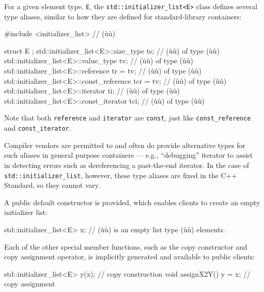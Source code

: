 For a given element type, \lstinline!E!, the
\lstinline!std::initializer_list<E>! class defines several type aliases,
similar to how they are defined for standard-library containers:

\begin{emcppslisting}[emcppsbatch=e3]
#include <initializer_list>  // (ù{}ù)

struct E { };
std::initializer_list<E>::size_type       ts;        // (ù{}ù)  of type (ù{}ù)
std::initializer_list<E>::value_type      tv;        // (ù{}ù)  of type (ù{}ù)
std::initializer_list<E>::reference       tr  = tv;  // (ù{}ù)  of type (ù{}ù)
std::initializer_list<E>::const_reference tcr = tv;  // (ù{}ù) of type (ù{}ù)
std::initializer_list<E>::iterator        ti;        // (ù{}ù)  of type (ù{}ù)
std::initializer_list<E>::const_iterator  tci;       // (ù{}ù) of type (ù{}ù)
\end{emcppslisting}
    

\noindent Note that both \lstinline!reference! and \lstinline!iterator! are
\lstinline!const!, just like \lstinline!const_reference! and
\lstinline!const_iterator!.

Compiler vendors are permitted to and often do provide alternative types
for such aliases in general purpose containers --- e.g., ``debugging''
iterator to assist in detecting errors such as dereferencing a
past-the-end iterator. In the case of \lstinline!std::initializer_list!,
however, these type aliases are fixed in the C++ Standard, so they
cannot vary.

A public default constructor is provided, which enables clients to
create an empty initializer list:

\begin{emcppslisting}[emcppsbatch=e3]
std::initializer_list<E> x;  // (ù{}ù) is an empty list type (ù{}ù) elements.
\end{emcppslisting}
    

\noindent Each of the other special member functions, such as the copy constructor
and copy assignment operator, is implicitly generated and available to
public clients:

\begin{emcppslisting}[emcppsbatch=e3]
std::initializer_list<E> y(x);  // copy construction
void assignX2Y() { y = x; }     // copy assignment
\end{emcppslisting}
    

